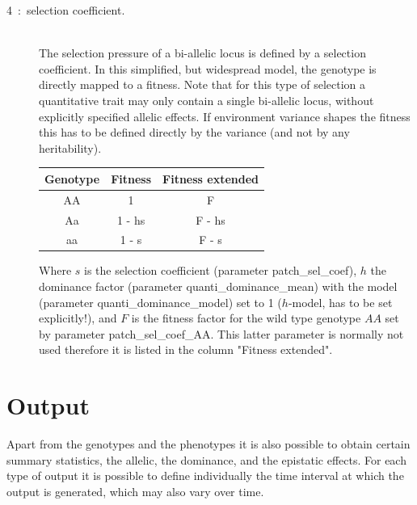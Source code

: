 \documentclass[letterpaper,12pt,oneside]{book}
\begin{document}
\begin{description}
\begin{description}
\item [4~:~selection coefficient.] \textbf{}\\
The selection pressure of a bi-allelic locus is defined by a selection coefficient. In this simplified, but widespread model, the genotype is directly mapped to a fitness. Note that for this type of selection a quantitative trait may only contain a single bi-allelic locus, without explicitly specified allelic effects. If environment variance shapes the fitness this has to be defined directly by the variance (and not by any heritability). \\

\begin{tabular}{ccc}
 \hline            
Genotype & Fitness & Fitness extended \\
\hline
AA & 1 			& F      \\
Aa & 1 - hs & F - hs \\
aa & 1 - s 	& F - s  \\
\hline
\end{tabular}

Where $s$ is the selection coefficient (parameter \textsf{patch\_sel\_coef}), $h$ the dominance factor (parameter  \textsf{quanti\_dominance\_mean}) with the model (parameter  \textsf{quanti\_dominance\_model}) set to 1 ($h$-model, has to be set explicitly!), and $F$ is the fitness factor for the wild type genotype $AA$ set by parameter  \textsf{patch\_sel\_coef\_AA}. This latter parameter is normally not used therefore it is listed in the column "Fitness extended".
 
\end{description}
\end{description}





\section{Output}
Apart from the genotypes and the phenotypes it is also possible to obtain certain summary statistics, the allelic, the dominance, and the epistatic effects. For each type of output it is possible to define individually the time interval at which the output is generated, which may also vary over time.
\end{document}
